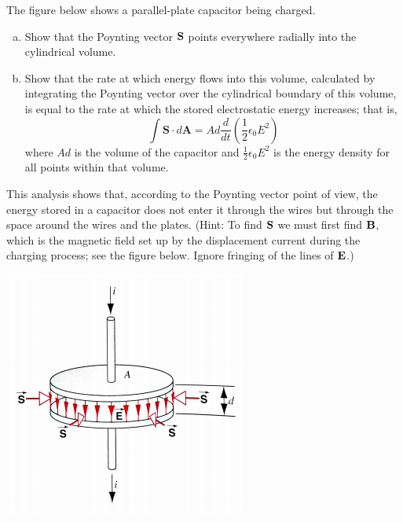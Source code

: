 \documentclass[11pt]{article}
\newcommand{\be}{\begin{enumerate}[a) ]}
\newcommand{\ee}{\end{enumerate}}
\begin{document}
\vspace*{0.25in}


\begin{problem}[(P38.14)*]

The figure below shows a parallel-plate capacitor being charged.
\be
\item Show that the Poynting vector $\mathbf{S}$ points everywhere radially into the cylindrical volume.
\item Show that the rate at which energy flows into this volume, calculated by integrating the
Poynting vector over the cylindrical boundary of this volume, is equal to the rate at which
the stored electrostatic energy increases; that is,
\[
	\int \mathbf { S } \cdot d \mathbf { A } = A d \frac { d } { d t } \left( \frac { 1 } { 2 } \epsilon _ { 0 } E ^ { 2 } \right)
\]
where $Ad$ is the volume of the capacitor and $\frac{1}{2}\epsilon_0E^2$
is the energy density for all points within
that volume.
\ee
This analysis shows that, according to the Poynting vector point of view, the energy stored in
a capacitor does not enter it through the wires but through the space around the wires and the
plates. (Hint: To find $\mathbf{S}$ we must first find $\mathbf{B}$, which is the magnetic field set up by the displacement
current during the charging process; see the figure below. Ignore fringing of the lines of $\mathbf{E}$.)
\begin{center}
\includegraphics[scale=0.4]{prob1.png}
\end{center}

\end{problem}
\end{document}
